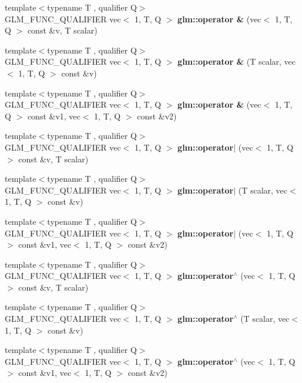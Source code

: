 \begin{DoxyCompactItemize}
\item 
{\footnotesize template$<$typename T , qualifier Q$>$ }\\G\+L\+M\+\_\+\+F\+U\+N\+C\+\_\+\+Q\+U\+A\+L\+I\+F\+I\+ER vec$<$ 1, T, Q $>$ {\bfseries glm\+::operator \&} (vec$<$ 1, T, Q $>$ const \&v, T scalar)
\item 
{\footnotesize template$<$typename T , qualifier Q$>$ }\\G\+L\+M\+\_\+\+F\+U\+N\+C\+\_\+\+Q\+U\+A\+L\+I\+F\+I\+ER vec$<$ 1, T, Q $>$ {\bfseries glm\+::operator \&} (T scalar, vec$<$ 1, T, Q $>$ const \&v)
\item 
{\footnotesize template$<$typename T , qualifier Q$>$ }\\G\+L\+M\+\_\+\+F\+U\+N\+C\+\_\+\+Q\+U\+A\+L\+I\+F\+I\+ER vec$<$ 1, T, Q $>$ {\bfseries glm\+::operator \&} (vec$<$ 1, T, Q $>$ const \&v1, vec$<$ 1, T, Q $>$ const \&v2)
\item 
{\footnotesize template$<$typename T , qualifier Q$>$ }\\G\+L\+M\+\_\+\+F\+U\+N\+C\+\_\+\+Q\+U\+A\+L\+I\+F\+I\+ER vec$<$ 1, T, Q $>$ {\bfseries glm\+::operator$\vert$} (vec$<$ 1, T, Q $>$ const \&v, T scalar)
\item 
{\footnotesize template$<$typename T , qualifier Q$>$ }\\G\+L\+M\+\_\+\+F\+U\+N\+C\+\_\+\+Q\+U\+A\+L\+I\+F\+I\+ER vec$<$ 1, T, Q $>$ {\bfseries glm\+::operator$\vert$} (T scalar, vec$<$ 1, T, Q $>$ const \&v)
\item 
{\footnotesize template$<$typename T , qualifier Q$>$ }\\G\+L\+M\+\_\+\+F\+U\+N\+C\+\_\+\+Q\+U\+A\+L\+I\+F\+I\+ER vec$<$ 1, T, Q $>$ {\bfseries glm\+::operator$\vert$} (vec$<$ 1, T, Q $>$ const \&v1, vec$<$ 1, T, Q $>$ const \&v2)
\item 
{\footnotesize template$<$typename T , qualifier Q$>$ }\\G\+L\+M\+\_\+\+F\+U\+N\+C\+\_\+\+Q\+U\+A\+L\+I\+F\+I\+ER vec$<$ 1, T, Q $>$ {\bfseries glm\+::operator$^\wedge$} (vec$<$ 1, T, Q $>$ const \&v, T scalar)
\item 
{\footnotesize template$<$typename T , qualifier Q$>$ }\\G\+L\+M\+\_\+\+F\+U\+N\+C\+\_\+\+Q\+U\+A\+L\+I\+F\+I\+ER vec$<$ 1, T, Q $>$ {\bfseries glm\+::operator$^\wedge$} (T scalar, vec$<$ 1, T, Q $>$ const \&v)
\item 
{\footnotesize template$<$typename T , qualifier Q$>$ }\\G\+L\+M\+\_\+\+F\+U\+N\+C\+\_\+\+Q\+U\+A\+L\+I\+F\+I\+ER vec$<$ 1, T, Q $>$ {\bfseries glm\+::operator$^\wedge$} (vec$<$ 1, T, Q $>$ const \&v1, vec$<$ 1, T, Q $>$ const \&v2)

\end{DoxyCompactItemize}
